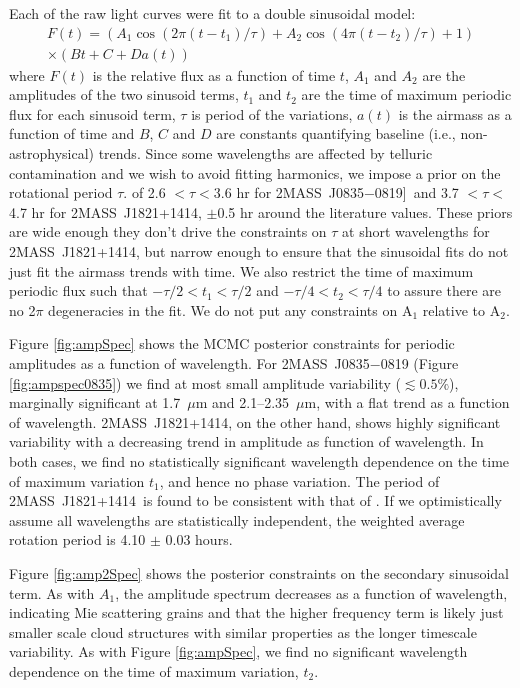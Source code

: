 \documentclass[twocolumn]{aastex6}
\newcommand{\sha}{2MASS~J0835$-$0819}
\newcommand{\shb}{2MASS~J1821+1414}
\begin{document}
Each of the raw light curves were fit to a double sinusoidal model:
\begin{equation}\label{eq:cosfit}
\begin{split}
F(t) = \left( A_1 \cos(2 \pi (t - t_1)/\tau) + A_2 \cos(4 \pi (t - t_2)/\tau) + 1\right) \\
\times (B t + C + D a(t))
\end{split}
\end{equation}
where $F(t)$ is the relative flux as a function of time $t$, $A_1$ and $A_2$ are the amplitudes of the two sinusoid terms, $t_1$ and $t_2$ are the time of maximum periodic flux for each sinusoid term, $\tau$ is period of the variations, $a(t)$ is the airmass as a function of time and $B$, $C$ and $D$ are constants quantifying baseline (i.e., non-astrophysical) trends.
Since some wavelengths are affected by telluric contamination and we wish to avoid fitting harmonics, we impose a prior on the rotational period $\tau$.
of 2.6 $< \tau < $3.6 hr for \sha]\ and 3.7 $< \tau <$ 4.7 hr for {\shb}, $\pm$0.5 hr around the literature values.
These priors are wide enough they don't drive the constraints on $\tau$ at short wavelengths for {\shb}, but narrow enough to ensure that the sinusoidal fits do not just fit the airmass trends with time.
We also restrict the time of maximum periodic flux such that $-\tau/2 < t_1 < \tau/2$ and $-\tau/4 < t_2 < \tau/4$ to assure there are no 2$\pi$ degeneracies in the fit.
We do not put any constraints on A$_1$ relative to A$_2$.

Figure \ref{fig:ampSpec} shows the MCMC posterior constraints for periodic amplitudes as a function of wavelength.
For {\sha} (Figure \ref{fig:ampspec0835}) we find at most small amplitude variability ($\lesssim 0.5\%$), marginally significant at 1.7~$\mu$m and 2.1--2.35~$\mu$m, with a flat trend as a function of wavelength.
\shb, on the other hand, shows highly significant variability with a decreasing trend in amplitude as function of wavelength.
In both cases, we find no statistically significant wavelength dependence on the time of maximum variation $t_1$, and hence no phase variation.
The period of \shb\ is found to be consistent with that of \citet{2015ApJ...799..154M}.
If we optimistically assume all wavelengths are statistically independent, the weighted average rotation period is 4.10 $\pm$ 0.03 hours.

Figure \ref{fig:amp2Spec} shows the posterior constraints on the secondary sinusoidal term.
As with $A_1$, the amplitude spectrum decreases as a function of wavelength, indicating Mie scattering grains and that the higher frequency term is likely just smaller scale cloud structures with similar properties as the longer timescale variability.
As with Figure \ref{fig:ampSpec}, we find no significant wavelength dependence on the time of maximum variation, $t_2$.
\end{document}
